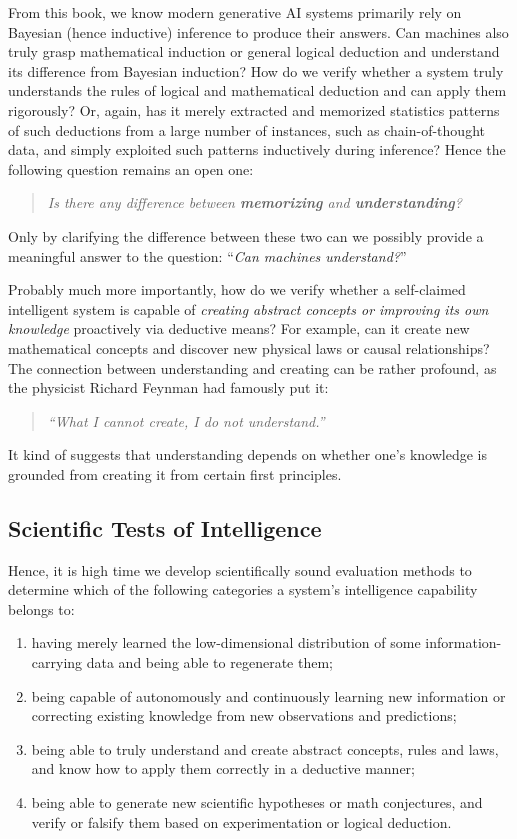 \documentclass[../../book-main.tex]{subfiles}
\begin{document}
From this book, we know modern generative AI systems primarily rely
on Bayesian (hence inductive) inference to produce their answers. Can
machines also truly grasp mathematical induction or general logical
deduction and understand its difference from Bayesian induction?
How do we verify whether a system truly understands the rules of
logical and mathematical deduction and can apply them rigorously? Or,
again, has it merely extracted and memorized statistics patterns of 
such deductions from a large number of instances, such as chain-of-thought 
data, and simply exploited such patterns inductively during inference? 
Hence the following question remains an open one:
\begin{quote}
    \centering
    \textit{Is there any difference between \textbf{memorizing} and
    \textbf{understanding}?}
\end{quote}
Only by clarifying the difference between these two can we possibly provide 
a meaningful answer to the question: ``\textit{Can machines understand?}''

Probably much more importantly, how do we verify whether a self-claimed
intelligent system is capable of \textit{creating abstract concepts or improving 
its own knowledge} proactively via deductive means? For example, can it create new 
mathematical concepts and discover new physical laws or causal relationships?
The connection between understanding and creating can be rather profound, 
as the physicist Richard Feynman had famously put it:
\begin{quote}
    \centering
    \textit{``What I cannot create, I do not understand.''}
\end{quote}
It kind of suggests that understanding depends on whether one's knowledge is 
grounded from creating it from certain first principles. 


\subsection{Scientific Tests of Intelligence}
Hence, it is high time we develop scientifically sound evaluation
methods to determine which of the following categories a system's
intelligence capability belongs to:
\begin{enumerate}[label={Level-\arabic*.}, leftmargin=*]
    \item having merely learned the low-dimensional distribution of some
        information-carrying data and being able to regenerate them;
    \item being capable of autonomously and continuously
        learning new information or correcting existing knowledge from new
        observations and predictions;
    \item being able to truly understand and create abstract
        concepts, rules and laws, and know how to apply them
        correctly in a deductive manner;
    \item being able to generate new scientific hypotheses or math conjectures, 
    and verify or falsify them based on experimentation or logical deduction.
\end{enumerate}
\end{document}
